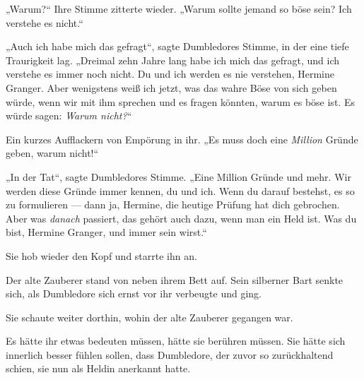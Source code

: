 „Warum?“ Ihre Stimme zitterte wieder.
„Warum sollte jemand so böse sein? Ich verstehe es nicht.“

„Auch ich habe mich das gefragt“, sagte Dumbledores Stimme, in der eine tiefe Traurigkeit lag.
„Dreimal zehn Jahre lang habe ich mich das gefragt, und ich verstehe es immer noch nicht. Du und ich werden es nie verstehen, Hermine Granger. Aber wenigstens weiß ich jetzt, was das wahre Böse von sich geben würde, wenn wir mit ihm sprechen und es fragen könnten, warum es böse ist. Es würde sagen: \emph{Warum nicht?}“

Ein kurzes Aufflackern von Empörung in ihr.
„Es muss doch eine \emph{Million} Gründe geben, warum nicht!“

„In der Tat“, sagte Dumbledores Stimme.
„Eine Million Gründe und mehr. Wir werden diese Gründe immer kennen, du und ich. Wenn du darauf bestehst, es so zu formulieren — dann ja, Hermine, die heutige Prüfung hat dich gebrochen. Aber was \emph{danach} passiert, das gehört auch dazu, wenn man ein Held ist. Was du bist, Hermine Granger, und immer sein wirst.“

Sie hob wieder den Kopf und starrte ihn an.

Der alte Zauberer stand von neben ihrem Bett auf. Sein silberner Bart senkte sich, als Dumbledore sich ernst vor ihr verbeugte und ging.

Sie schaute weiter dorthin, wohin der alte Zauberer gegangen war.

Es hätte ihr etwas bedeuten müssen, hätte sie berühren müssen. Sie hätte sich innerlich besser fühlen sollen, dass Dumbledore, der zuvor so zurückhaltend schien, sie nun als Heldin anerkannt hatte.

